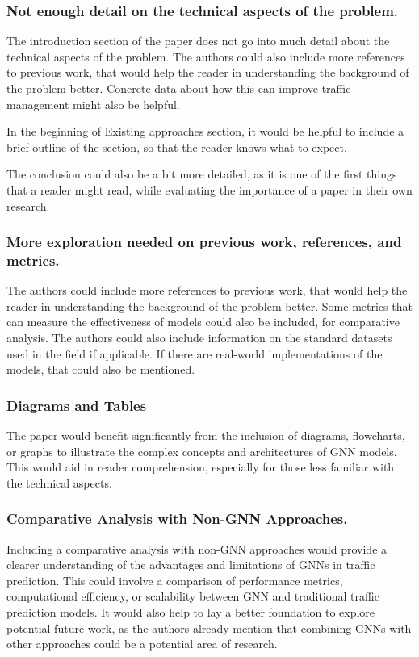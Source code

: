 \documentclass[12pt]{article}
\begin{document}
\subsubsection*{Not enough detail on the technical aspects of the problem.}
The introduction section of the paper does not go into much detail about the technical aspects of the problem. The authors could also include
more references to previous work, that would help the reader in understanding the background of the problem better. Concrete data about how 
this can improve traffic management might also be helpful. 

In the beginning of Existing approaches section, it would be helpful to include a brief outline of the section, so that the reader knows what to expect.

The conclusion could also be a bit more detailed, as it is one of the first things that a reader might read, while evaluating the importance
of a paper in their own research.

\subsubsection*{More exploration needed on previous work, references, and metrics.}
The authors could include more references to previous work, that would help the reader in understanding the background of the problem better.
Some metrics that can measure the effectiveness of models could also be included, for comparative analysis. The authors could also include 
information on the standard datasets used in the field if applicable. If there are real-world implementations of the models, that could also be
mentioned.

\subsubsection*{Diagrams and Tables}
The paper would benefit significantly from the inclusion of diagrams, flowcharts, or graphs to illustrate the complex concepts and architectures of 
GNN models. This would aid in reader comprehension, especially for those less familiar with the technical aspects. 


\subsubsection*{Comparative Analysis with Non-GNN Approaches.}
Including a comparative analysis with non-GNN approaches would provide a clearer understanding of the advantages and limitations of GNNs 
in traffic prediction. This could involve a comparison of performance metrics, computational efficiency, or scalability between GNN and traditional 
traffic prediction models. It would also help to lay a better foundation to explore potential future work, as the authors already mention that combining
GNNs with other approaches could be a potential area of research.
\end{document}

